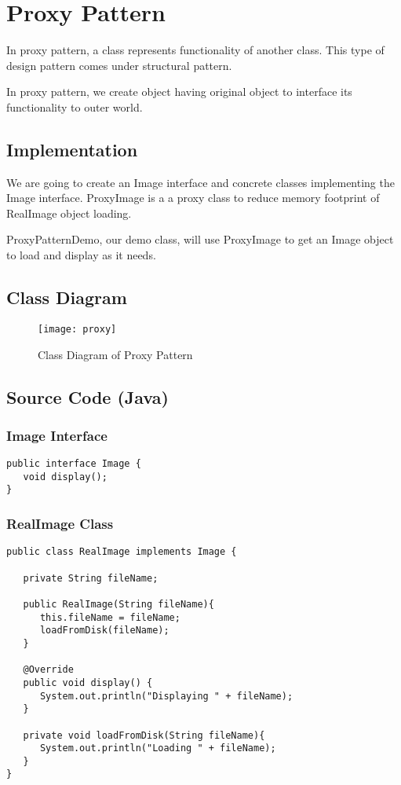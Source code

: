 \newpage
\section{Proxy Pattern}

In proxy pattern, a class represents functionality of another class. This type of design pattern comes under structural pattern.

In proxy pattern, we create object having original object to interface its functionality to outer world.

\subsection{Implementation}

We are going to create an Image interface and concrete classes implementing the Image interface. ProxyImage is a a proxy class to reduce memory footprint of RealImage object loading.

ProxyPatternDemo, our demo class, will use ProxyImage to get an Image object to load and display as it needs.

\subsection{Class Diagram}

\begin{figure}[h]
\centering
\texttt{[image: proxy]}
\caption{Class Diagram of Proxy Pattern}
\end{figure}

\newpage
\subsection{Source Code (Java)}

\subsubsection{Image Interface}

\begin{verbatim}
public interface Image {
   void display();
}
\end{verbatim}

\subsubsection{RealImage Class}

\begin{verbatim}
public class RealImage implements Image {

   private String fileName;

   public RealImage(String fileName){
      this.fileName = fileName;
      loadFromDisk(fileName);
   }

   @Override
   public void display() {
      System.out.println("Displaying " + fileName);
   }

   private void loadFromDisk(String fileName){
      System.out.println("Loading " + fileName);
   }
}
\end{verbatim}

